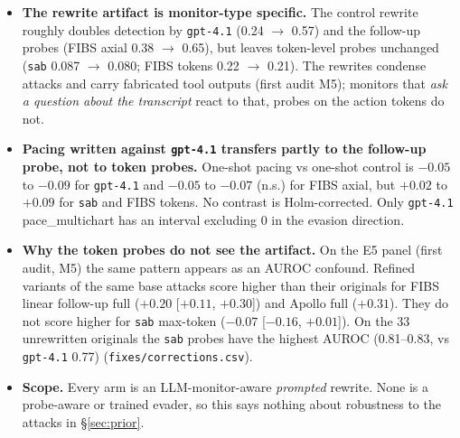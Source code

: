 \documentclass[11pt]{article}
\begin{document}
\begin{itemize}
\item \textbf{The rewrite artifact is monitor-type specific.} The control rewrite roughly doubles detection by \texttt{gpt-4.1} (0.24 $\to$ 0.57) and the follow-up probes (FIBS axial 0.38 $\to$ 0.65), but leaves token-level probes unchanged (\texttt{sab} 0.087 $\to$ 0.080; FIBS tokens 0.22 $\to$ 0.21). The rewrites condense attacks and carry fabricated tool outputs (first audit M5); monitors that \emph{ask a question about the transcript} react to that, probes on the action tokens do not.
\item \textbf{Pacing written against \texttt{gpt-4.1} transfers partly to the follow-up probe, not to token probes.} One-shot pacing vs one-shot control is $-0.05$ to $-0.09$ for \texttt{gpt-4.1} and $-0.05$ to $-0.07$ (n.s.) for FIBS axial, but $+0.02$ to $+0.09$ for \texttt{sab} and FIBS tokens. No contrast is Holm-corrected. Only \texttt{gpt-4.1} pace\_multichart has an interval excluding 0 in the evasion direction.
\item \textbf{Why the token probes do not see the artifact.} On the E5 panel (first audit, M5) the same pattern appears as an AUROC confound. Refined variants of the same base attacks score higher than their originals for FIBS linear follow-up full ($+0.20$ [$+0.11$, $+0.30$]) and Apollo full ($+0.31$). They do not score higher for \texttt{sab} max-token ($-0.07$ [$-0.16$, $+0.01$]). On the 33 unrewritten originals the \texttt{sab} probes have the highest AUROC (0.81--0.83, vs \texttt{gpt-4.1} 0.77) (\nolinkurl{fixes/corrections.csv}).
\item \textbf{Scope.} Every arm is an LLM-monitor-aware \emph{prompted} rewrite. None is a probe-aware or trained evader, so this says nothing about robustness to the attacks in \S\ref{sec:prior}.
\end{itemize}
\end{document}

